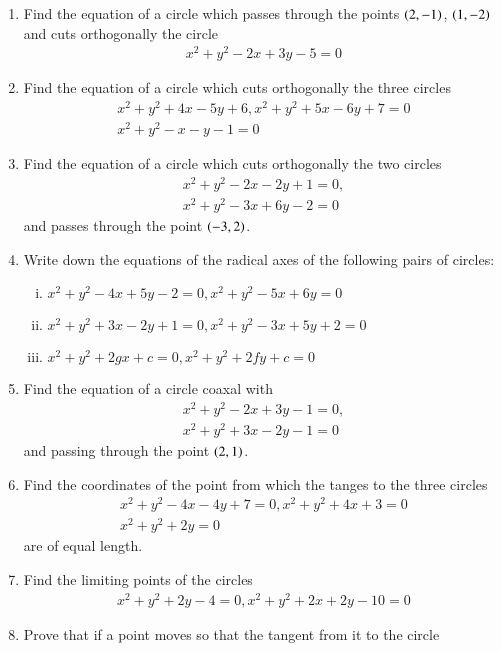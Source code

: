 \begin{enumerate}[1.]
\item Find the equation of a circle which passes through the points $\left(2,-1\right)$, $\left(1,-2\right)$ and cuts orthogonally the circle
\begin{align*}
x^2+y^2-2x+3y-5 = 0
\end{align*}
\item Find the equation of a circle which cuts orthogonally the three circles
\begin{align*}
x^2+y^2+4x -5y+6, x^2+y^2+5x-6y+7 = 0
\\
x^2+y^2-x-y-1 = 0
\end{align*}
\item Find the equation of a circle which cuts orthogonally the two circles
\begin{align*}
x^2+y^2-2x-2y+1 = 0,
\\
 x^2+y^2-3x+6y-2 = 0
\end{align*}
and passes through the point $\left(-3,2\right)$.
\item Write down the equations of the radical axes of the following pairs of circles:
\begin{enumerate}[(i)]
\item
$
x^2+y^2-4x+5y-2=0, x^2+y^2-5x+6y=0
$
\item
$
x^2+y^2+3x-2y+1 = 0, x^2+y^2-3x+5y+2=0
$
\item
$
x^2+y^2+2gx+c = 0, x^2+y^2+2fy+c = 0
$
\end{enumerate}
\item Find the equation of a circle coaxal with
\begin{align*}
x^2+y^2-2x+3y-1 = 0,
\\
 x^2+y^2+3x-2y-1 = 0
\end{align*}
and passing through the point $\left(2,1\right)$.
\item Find the coordinates of the point from which the tanges to the three circles
\begin{align*}
x^2+y^2-4x-4y+7 = 0, x^2+y^2+4x+3 = 0
\\
x^2+y^2+2y = 0
\end{align*}
are of equal length.
\item Find the limiting points of the circles
\begin{align*}
x^2+y^2+2y-4 = 0, x^2+y^2+2x+2y-10 = 0
\end{align*}
\item Prove that if a point moves so that the tangent from it to the circle
\begin{align*}

\end{align*}
\end{enumerate}
